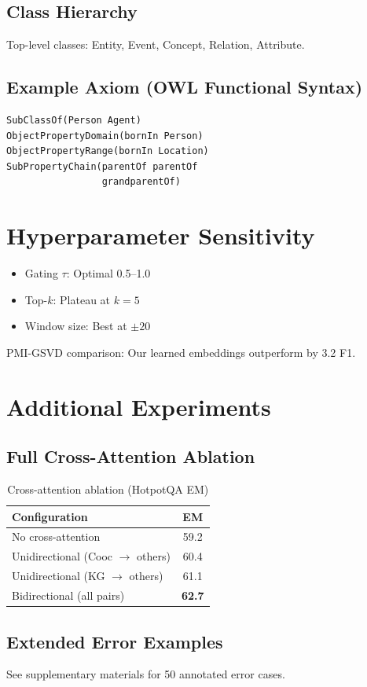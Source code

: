 \documentclass[10pt,twocolumn]{article}
\begin{document}
\subsection{Class Hierarchy}
Top-level classes: Entity, Event, Concept, Relation, Attribute.

\subsection{Example Axiom (OWL Functional Syntax)}
\begin{verbatim}
SubClassOf(Person Agent)
ObjectPropertyDomain(bornIn Person)
ObjectPropertyRange(bornIn Location)
SubPropertyChain(parentOf parentOf 
                 grandparentOf)
\end{verbatim}

\section{Hyperparameter Sensitivity}
\label{app:hyper}

\begin{itemize}
    \item Gating $\tau$: Optimal 0.5--1.0
    \item Top-$k$: Plateau at $k=5$
    \item Window size: Best at $\pm20$
\end{itemize}

PMI-GSVD comparison: Our learned embeddings outperform by 3.2 F1.

\section{Additional Experiments}
\label{app:extra}


\subsection{Full Cross-Attention Ablation}

\begin{table}[h]
\centering
\caption{Cross-attention ablation (HotpotQA EM)}
\small
\begin{tabular}{@{}lc@{}}
\toprule
\textbf{Configuration} & \textbf{EM} \\
\midrule
No cross-attention & 59.2 \\
Unidirectional (Cooc $\rightarrow$ others) & 60.4 \\
Unidirectional (KG $\rightarrow$ others) & 61.1 \\
Bidirectional (all pairs) & \textbf{62.7} \\
\bottomrule
\end{tabular}
\end{table}


\subsection{Extended Error Examples}
See supplementary materials for 50 annotated error cases.
\end{document}
